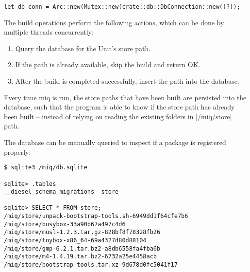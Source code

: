 \begin{verbatim}
let db_conn = Arc::new(Mutex::new(crate::db::DbConnection::new()?));
\end{verbatim}

The build operations perform the following actions, which
can be done by multiple threads concurrently:

\begin{enumerate}
    \item Query the database for the Unit's store path.
    \item If the path is already available, skip the build
    and return OK.
    \item After the build is completed successfully, insert
    the path into the database.
\end{enumerate}

Every time miq is run, the store paths that have been built
are persisted into the database, such that the program is
able to know if the store path has already been built --
instead of relying on reading the existing folders in
|/miq/store| path.

The database can be manually queried to inspect if a package
is registered properly:

\begin{verbatim}
$ sqlite3 /miq/db.sqlite

sqlite> .tables
__diesel_schema_migrations  store

sqlite> SELECT * FROM store;
/miq/store/unpack-bootstrap-tools.sh-6949dd1f64cfe7b6
/miq/store/busybox-33a90b67a497c4d6
/miq/store/musl-1.2.3.tar.gz-828bf8f78328fb26
/miq/store/toybox-x86_64-69a4327d80d88104
/miq/store/gmp-6.2.1.tar.bz2-a8db6558fa4fba6b
/miq/store/m4-1.4.19.tar.bz2-6732a25e4458acb
/miq/store/bootstrap-tools.tar.xz-9d678d0fc5041f17
\end{verbatim}

%
